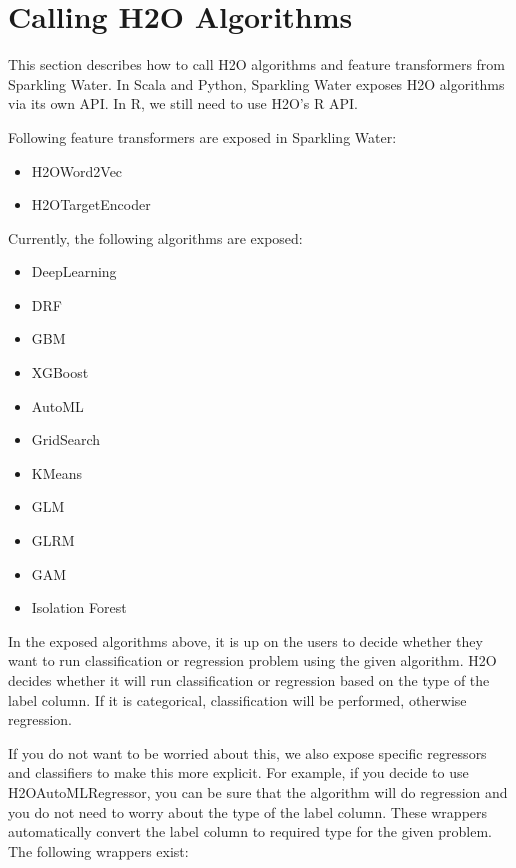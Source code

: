 \documentclass{standalone}
\begin{document}
	\section{Calling H2O Algorithms}

	This section describes how to call H2O algorithms and feature transformers from Sparkling Water. In Scala and Python, Sparkling Water
	exposes H2O algorithms via its own API. In R, we still need to use H2O's R API.

	Following feature transformers are exposed in Sparkling Water:

	\begin{itemize}
		\item H2OWord2Vec
		\item H2OTargetEncoder
	\end{itemize}

	Currently, the following algorithms are exposed:

	\begin{itemize}
		\item DeepLearning
		\item DRF
		\item GBM
		\item XGBoost
		\item AutoML
		\item GridSearch
		\item KMeans
		\item GLM
		\item GLRM
		\item GAM
		\item Isolation Forest
	\end{itemize}

	In the exposed algorithms above, it is up on the users to decide whether they want to run classification or
	regression problem using the given algorithm. H2O decides whether it will run classification or regression based
	on the type of the label column. If it is categorical, classification will be performed, otherwise regression.

	If you do not want to be worried about this, we also expose specific regressors and classifiers to make this more
	explicit. For example, if you decide to use H2OAutoMLRegressor, you can be sure that the algorithm will do regression
	and you do not need to worry about the type of the label column. These wrappers automatically convert the label
	column to required type for the given problem. The following wrappers exist:
\end{document}
